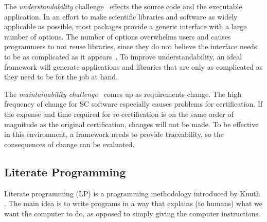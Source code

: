 \documentclass{sig-alternate-05-2015}
\begin{document}
The \textit{understandability} challenge~\cite{Yu2011} effects the source
code and the executable application. In an effort to make scientific
libraries and software as widely applicable as possible, most packages provide a
generic interface with a large number of options. The number of options
overwhelms users and causes programmers to not reuse libraries, since they do
not believe the interface needs to be as complicated as it
appears~\cite{Dubois2002}. To improve understandability, an ideal framework will
generate applications and libraries that are only as complicated as they need to
be for the job at hand.


The \textit{maintainability challenge}~\cite{Yu2011} comes up as requirements
change.  The high frequency of change for SC software especially causes problems
for certification. If the expense and time required for re-certification is on
the same order of magnitude as the original certification, changes will not be
made. To be effective in this environment, a framework needs to provide
traceability, so the consequences of change can be evaluated.

\subsection{Literate Programming} \label{ssec:literate}

Literate programming (LP) is a programming methodology introduced by Knuth
\cite{Knuth1984}. The main idea is to write programs in a way that explains (to
humans) what we want the computer to do, as opposed to simply giving the
computer instructions. %
\end{document}
